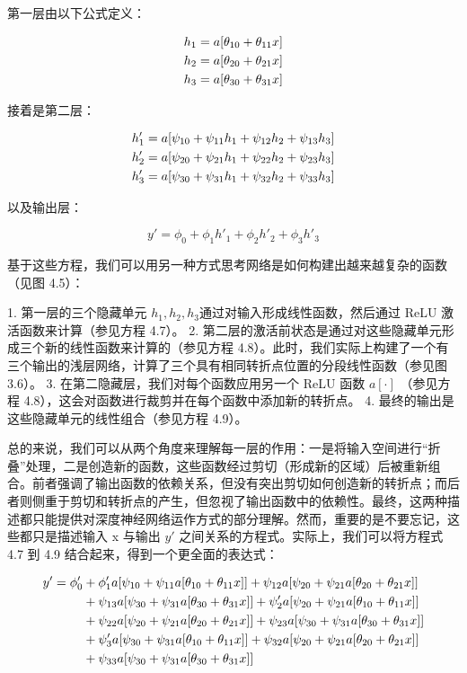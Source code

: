 \documentclass[lang=cn,newtx,10pt,scheme=chinese]{elegantbook}
\begin{document}
第一层由以下公式定义：


\begin{align}
	h_1 = a[\theta_{10} + \theta_{11}x] \notag \\
	h_2 = a[\theta_{20} + \theta_{21}x] \notag \\
	h_3 = a[\theta_{30} + \theta_{31}x] 
\end{align} 


接着是第二层：


\begin{align}
	h'_1 = a[\psi_{10} + \psi_{11}h_1 + \psi_{12}h_2 + \psi_{13}h_3] \notag \\
	h'_2 = a[\psi_{20} + \psi_{21}h_1 + \psi_{22}h_2 + \psi_{23}h_3] \notag \\
	h'_3 = a[\psi_{30} + \psi_{31}h_1 + \psi_{32}h_2 + \psi_{33}h_3] 
\end{align} 


以及输出层：

\begin{equation}
y' = \phi_0 + \phi_1h'_1 + \phi_2h'_2 + \phi_3h'_3 
\end{equation}

基于这些方程，我们可以用另一种方式思考网络是如何构建出越来越复杂的函数（见图 4.5）：

1. 第一层的三个隐藏单元 \(h_1,h_2,h_3\)通过对输入形成线性函数，然后通过 ReLU 激活函数来计算（参见方程 4.7）。
2. 第二层的激活前状态是通过对这些隐藏单元形成三个新的线性函数来计算的（参见方程 4.8）。此时，我们实际上构建了一个有三个输出的浅层网络，计算了三个具有相同转折点位置的分段线性函数（参见图 3.6）。 
3. 在第二隐藏层，我们对每个函数应用另一个 ReLU 函数 \(a[\cdot]\) （参见方程 4.8），这会对函数进行裁剪并在每个函数中添加新的转折点。
4. 最终的输出是这些隐藏单元的线性组合（参见方程 4.9）。


总的来说，我们可以从两个角度来理解每一层的作用：一是将输入空间进行“折叠”处理，二是创造新的函数，这些函数经过剪切（形成新的区域）后被重新组合。前者强调了输出函数的依赖关系，但没有突出剪切如何创造新的转折点；而后者则侧重于剪切和转折点的产生，但忽视了输出函数中的依赖性。最终，这两种描述都只能提供对深度神经网络运作方式的部分理解。然而，重要的是不要忘记，这些都只是描述输入 x 与输出 \(y \prime\) 之间关系的方程式。实际上，我们可以将方程式 4.7 到 4.9 结合起来，得到一个更全面的表达式：



\begin{align}
	y' = \phi'_0 &+ \phi'_1 a[\psi_{10} + \psi_{11} a[\theta_{10} + \theta_{11} x]] + \psi_{12} a[\psi_{20} + \psi_{21} a[\theta_{20} + \theta_{21} x]] \notag \\
	&+ \psi_{13} a[\psi_{30} + \psi_{31} a[\theta_{30} + \theta_{31} x]] + \psi'_{2} a[\psi_{20} + \psi_{21} a[\theta_{10} + \theta_{11} x]] \notag \\
	&+ \psi_{22} a[\psi_{20} + \psi_{21} a[\theta_{20} + \theta_{21} x]] + \psi_{23} a[\psi_{30} + \psi_{31} a[\theta_{30} + \theta_{31} x]] \notag \\
	&+ \psi'_{3} a[\psi_{30} + \psi_{31} a[\theta_{10} + \theta_{11} x]] + \psi_{32} a[\psi_{20} + \psi_{21} a[\theta_{20} + \theta_{21} x]] \notag \\
	&+ \psi_{33} a[\psi_{30} + \psi_{31} a[\theta_{30} + \theta_{31} x]] 
\end{align} 
\end{document}
